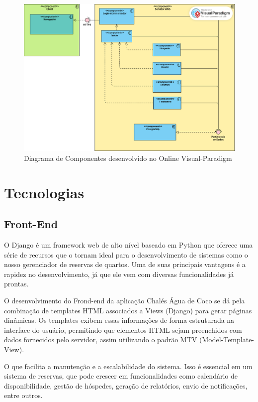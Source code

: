 \documentclass[
	12pt,				%
	openany,			%
	twoside,			%
	a4paper,			%
	english,			%
	french,				%
	spanish,			%
	brazil				%
	]{abntex2}
\begin{document}
\begin{figure}[h!]
	\centering
	\includegraphics[width=\textwidth]{0406-Componentes.png}
	\caption{Diagrama de Componentes desenvolvido no Online Visual-Paradigm}
	\label{fig:diagramacomponentes}
\end{figure}


\section{Tecnologias}
\subsection{Front-End}
O Django é um framework web de alto nível baseado em Python que oferece uma série de recursos que o tornam ideal para o desenvolvimento de sistemas como o nosso gerenciador de reservas de quartos. Uma de suas principais vantagens é a rapidez no desenvolvimento, já que ele vem com diversas funcionalidades já prontas.

O desenvolvimento do Frond-end da aplicação Chalés Água de Coco se dá pela combinação de templates HTML associados a Views (Django) para gerar páginas dinâmicas. Os templates exibem essas informações de forma estruturada na interface do usuário, permitindo que elementos HTML sejam preenchidos com dados fornecidos pelo servidor, assim utilizando o padrão MTV (Model-Template-View).

O que facilita a manutenção e a escalabilidade do sistema. Isso é essencial em um sistema de reservas, que pode crescer em funcionalidades como calendário de disponibilidade, gestão de hóspedes, geração de relatórios, envio de notificações, entre outros.
\end{document}
